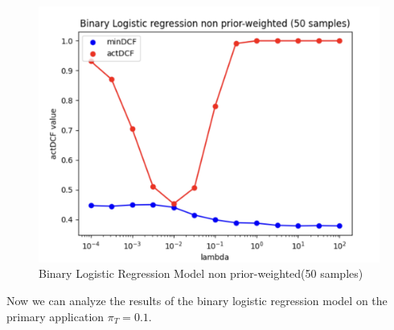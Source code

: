 \documentclass{article}
\begin{document}
\begin{figure}[H]
\begin{minipage}{.3\textwidth}
            \centering
            \includegraphics[width=\linewidth]{./img/LLR_noW503.png}
        \end{minipage}
        \caption{Binary Logistic Regression Model non prior-weighted(50 samples)} %
        \label{fig:LLR_model_50} %
    \end{figure}
    Now we can analyze the results of the binary logistic regression model on the primary application \(\pi_T=0.1\).
\end{document}
